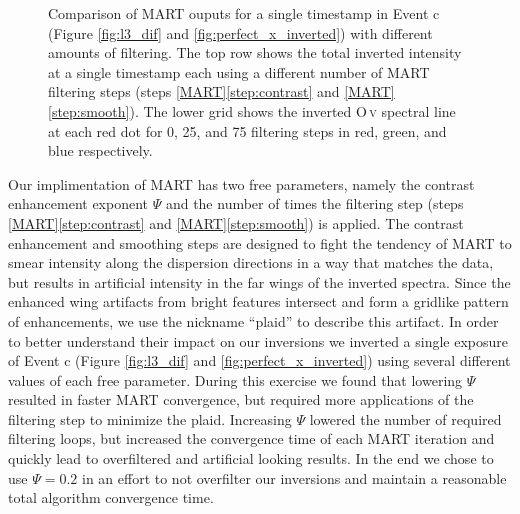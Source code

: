 	\begin{figure}[htb!]
		\centering
		\caption{Comparison of MART ouputs for a single timestamp in Event c (Figure \ref{fig:l3_dif} and \ref{fig:perfect_x_inverted}) with different amounts of filtering. 
		The top row shows the total inverted intensity at a single timestamp each using a different number of MART filtering steps (steps \ref{MART}\ref{step:contrast} and \ref{MART}\ref{step:smooth}).  
		The lower grid shows the inverted O\,\textsc{v} spectral line at each red dot for 0, 25, and 75 filtering steps in red, green, and blue respectively.}
		\label{fig:perfect_x_invertcomp}
	\end{figure}
	
	
    Our implimentation of MART has two free parameters, namely the contrast enhancement exponent $\Psi$ and the number of times the filtering step (steps \ref{MART}\ref{step:contrast} and \ref{MART}\ref{step:smooth}) is applied.
    The contrast enhancement and smoothing steps are designed to fight the tendency of MART to smear intensity along the dispersion directions in a way that matches the data, but results in artificial intensity in the far wings of the inverted spectra.
	Since the enhanced wing artifacts from bright features intersect and form a gridlike pattern of enhancements, we use the nickname ``plaid'' to describe
	this artifact.
    In order to better understand their impact on our inversions we inverted a single exposure of Event c (Figure \ref{fig:l3_dif} and \ref{fig:perfect_x_inverted}) using several different values of each free parameter.
    During this exercise we found that lowering $\Psi$ resulted in faster MART convergence, but required more applications of the filtering step to minimize the plaid.
    Increasing $\Psi$ lowered the number of required filtering loops, but increased the convergence time of each MART iteration and quickly lead to overfiltered and artificial looking results.
    In the end we chose to use $\Psi=0.2$ in an effort to not overfilter our inversions and maintain a reasonable total algorithm convergence time.   
    
